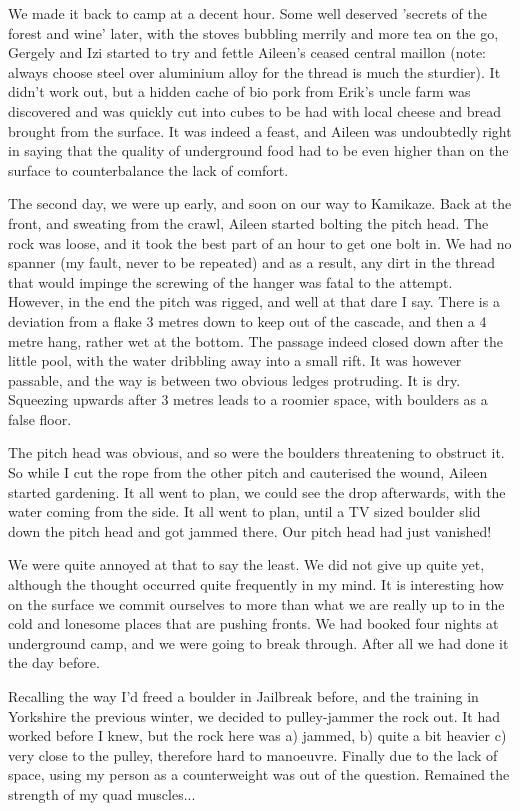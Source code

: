 We made it back to camp at a decent hour. Some well deserved 'secrets of the forest and wine' later, with the stoves bubbling merrily and more tea on the go, Gergely and Izi started to try and fettle Aileen's ceased central maillon (note: always choose steel over aluminium alloy for the thread is much the sturdier). It didn't work out, but a hidden cache of bio pork from Erik's uncle farm was discovered and was quickly cut into cubes to be had with local cheese and bread brought from the surface. It was indeed a feast, and Aileen was undoubtedly right in saying that the quality of underground food had to be even higher than on the surface to counterbalance the lack of comfort.

The second day, we were up early, and soon on our way to Kamikaze. Back at the front, and sweating from the crawl, Aileen started bolting the pitch head. The rock was loose, and it took the best part of an hour to get one bolt in. We had no spanner (my fault, never to be repeated) and as a result, any dirt in the thread that would impinge the screwing of the hanger was fatal to the attempt. However, in the end the pitch was rigged, and well at that dare I say. There is a deviation from a flake 3 metres down to keep out of the cascade, and then a 4 metre hang, rather wet at the bottom. The passage indeed closed down after the little pool, with the water dribbling away into a small rift. It was however passable, and the way is between two obvious ledges protruding. It is dry. Squeezing upwards after 3 metres leads to a roomier space, with boulders as a false floor.

The pitch head was obvious, and so were the boulders threatening to obstruct it. So while I cut the rope from the other pitch and cauterised the wound, Aileen started gardening. It all went to plan, we could see the drop afterwards, with the water coming from the side. It all went to plan, until a TV sized boulder slid down the pitch head and got jammed there. Our pitch head had just vanished!



We were quite annoyed at that to say the least. We did not give up quite yet, although the thought occurred quite frequently in my mind. It is interesting how on the surface we commit ourselves to more than what we are really up to in the cold and lonesome places that are pushing fronts. We had booked four nights at underground camp, and we were going to break through. After all we had done it the day before.

Recalling the way I'd freed a boulder in Jailbreak before, and the training in Yorkshire the previous winter, we decided to pulley-jammer the rock out. It had worked before I knew, but the rock here was a) jammed, b) quite a bit heavier c) very close to the pulley, therefore hard to manoeuvre. Finally due to the lack of space, using my person as a counterweight was out of the question. Remained the strength of my quad muscles...

